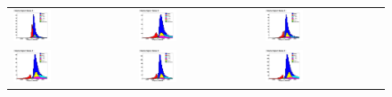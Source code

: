 \begin{figure}[h!]
\centering
\begin{tabular}{l  l  l}
  \includegraphics[width=0.33\textwidth]{plots/mc_breakdown_comp_0_bin_0_att_0} 
  &\includegraphics[width=0.33\textwidth]{plots/mc_breakdown_comp_0_bin_1_att_0}  
  &\includegraphics[width=0.33\textwidth]{plots/mc_breakdown_comp_0_bin_2_att_0} \\
  \includegraphics[width=0.33\textwidth]{plots/mc_breakdown_comp_0_bin_3_att_0} 
  &\includegraphics[width=0.33\textwidth]{plots/mc_breakdown_comp_0_bin_4_att_0} 
  &\includegraphics[width=0.33\textwidth]{plots/mc_breakdown_comp_0_bin_5_att_0}  

\end{tabular}
\end{figure}
